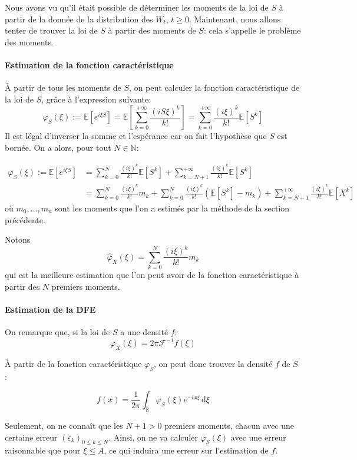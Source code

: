 \documentclass[12pt]{article}
\newcommand{\pth}[1]{\left(#1\right)}
\newcommand{\cro}[1]{\left[#1\right]}
\newcommand{\vg}{,\,}
\newcommand{\de}{\,\mathrm{d}}
\newcommand{\En}{\mathbb{N}}
\newcommand{\Esp}[1]{\mathbb{E}\cro{#1}}
\begin{document}
Nous avons vu qu'il était possible de déterminer les moments de la loi de $S$ à partir de la donnée de la distribution des $W_t\vg t\geqslant 0$. Maintenant, nous allons tenter de trouver la loi de $S$ à partir des moments de $S$: cela s'appelle le problème des moments.

\paragraph{Estimation de la fonction caractéristique}

À partir de tous les moments de $S$, on peut calculer la fonction caractéristique de la loi de $S$, grâce à l'expression suivante:
\[\varphi_S(\xi):=\Esp{e^{i\xi S}}=\Esp{\sum_{k=0}^{+\infty}\frac{(iS\xi)^k}{k!}}=\sum_{k=0}^{+\infty}\frac{(i\xi)^k}{k!}\Esp{S^k}\]
Il est légal d'inverser la somme et l'espérance car on fait l'hypothèse que $S$ est bornée. On a alors, pour tout $N\in\En$:

\begin{align*}
\varphi_S(\xi):=\Esp{e^{i\xi S}}
&=\sum_{k=0}^{N}\frac{(i\xi)^k}{k!}\Esp{S^k}+\sum_{k=N+1}^{+\infty}\frac{(i\xi)^k}{k!}\Esp{S^k}\\
&= \sum_{k=0}^{N}\frac{(i\xi)^k}{k!}m_k + \sum_{k=0}^{N}\frac{(i\xi)^k}{k!}\pth{\Esp{S^k}-m_k}+\sum_{k=N+1}^{+\infty}\frac{(i\xi)^k}{k!}\Esp{X^k}
\end{align*}
où $m_0,\hdots, m_n$ sont les moments que l'on a estimés par la méthode de la section précédente.

Notons \[\hat{\varphi}_X(\xi)=\sum_{k=0}^{N}\frac{(i\xi)^k}{k!}m_k\] qui est la meilleure estimation que l'on peut avoir de la fonction caractéristique à partir des $N$ premiers moments.

\paragraph{Estimation de la DFE}

On remarque que, si la loi de $S$ a une densité $f$:
\[\varphi_X(\xi)=2\pi \mathcal{F}^{-1}f(\xi)\]

À partir de la fonction caractéristique $\varphi_S$, on peut donc trouver la densité $f$ de $S$ :

\[f(x) = \frac1{2\pi} \int_{\mathbb R}\varphi_S(\xi)e^{-ix\xi}\de\xi\]

Seulement, on ne connaît que les $N+1>0$ premiers moments, chacun avec une certaine erreur $(\varepsilon_k)_{0\leqslant k\leqslant N}$. Ainsi, on ne va calculer $\varphi_S(\xi)$ avec une erreur raisonnable que pour $\xi\leqslant A$, ce qui induira une erreur sur l'estimation de $f$.
\end{document}
